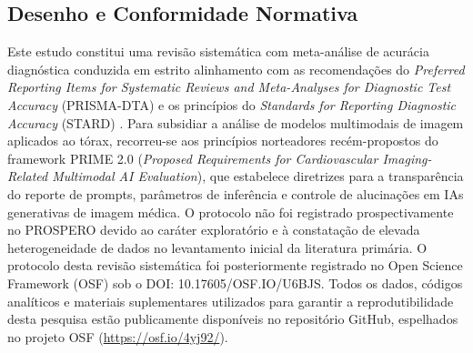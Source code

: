 \documentclass[12pt,a4paper]{article}
\begin{document}
\subsection{Desenho e Conformidade Normativa}
Este estudo constitui uma revisão sistemática com meta-análise de acurácia diagnóstica conduzida em estrito alinhamento com as recomendações do \textit{Preferred Reporting Items for Systematic Reviews and Meta-Analyses for Diagnostic Test Accuracy} (PRISMA-DTA) \cite{mcinnes} e os princípios do \textit{Standards for Reporting Diagnostic Accuracy} (STARD) \cite{stard}. Para subsidiar a análise de modelos multimodais de imagem aplicados ao tórax, recorreu-se aos princípios norteadores recém-propostos do framework PRIME 2.0 \cite{kagiyama} (\textit{Proposed Requirements for Cardiovascular Imaging-Related Multimodal AI Evaluation}), que estabelece diretrizes para a transparência do reporte de prompts, parâmetros de inferência e controle de alucinações em IAs generativas de imagem médica. O protocolo não foi registrado prospectivamente no PROSPERO devido ao caráter exploratório e à constatação de elevada heterogeneidade de dados no levantamento inicial da literatura primária. O protocolo desta revisão sistemática foi posteriormente registrado no Open Science Framework (OSF) sob o DOI: 10.17605/OSF.IO/U6BJS. Todos os dados, códigos analíticos e materiais suplementares utilizados para garantir a reprodutibilidade desta pesquisa estão publicamente disponíveis no repositório GitHub, espelhados no projeto OSF (\url{https://osf.io/4yj92/}).
\end{document}
